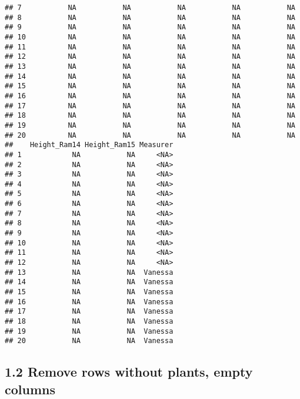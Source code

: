 \documentclass[]{article}
\newenvironment{Shaded}{\begin{snugshade}}{\end{snugshade}}
\newcommand{\KeywordTok}[1]{\textcolor[rgb]{0.13,0.29,0.53}{\textbf{#1}}}
\newcommand{\DecValTok}[1]{\textcolor[rgb]{0.00,0.00,0.81}{#1}}
\newcommand{\StringTok}[1]{\textcolor[rgb]{0.31,0.60,0.02}{#1}}
\newcommand{\OtherTok}[1]{\textcolor[rgb]{0.56,0.35,0.01}{#1}}
\newcommand{\OperatorTok}[1]{\textcolor[rgb]{0.81,0.36,0.00}{\textbf{#1}}}
\newcommand{\NormalTok}[1]{#1}
\begin{document}
\begin{verbatim}
## 7           NA           NA           NA           NA           NA
## 8           NA           NA           NA           NA           NA
## 9           NA           NA           NA           NA           NA
## 10          NA           NA           NA           NA           NA
## 11          NA           NA           NA           NA           NA
## 12          NA           NA           NA           NA           NA
## 13          NA           NA           NA           NA           NA
## 14          NA           NA           NA           NA           NA
## 15          NA           NA           NA           NA           NA
## 16          NA           NA           NA           NA           NA
## 17          NA           NA           NA           NA           NA
## 18          NA           NA           NA           NA           NA
## 19          NA           NA           NA           NA           NA
## 20          NA           NA           NA           NA           NA
##    Height_Ram14 Height_Ram15 Measurer
## 1            NA           NA     <NA>
## 2            NA           NA     <NA>
## 3            NA           NA     <NA>
## 4            NA           NA     <NA>
## 5            NA           NA     <NA>
## 6            NA           NA     <NA>
## 7            NA           NA     <NA>
## 8            NA           NA     <NA>
## 9            NA           NA     <NA>
## 10           NA           NA     <NA>
## 11           NA           NA     <NA>
## 12           NA           NA     <NA>
## 13           NA           NA  Vanessa
## 14           NA           NA  Vanessa
## 15           NA           NA  Vanessa
## 16           NA           NA  Vanessa
## 17           NA           NA  Vanessa
## 18           NA           NA  Vanessa
## 19           NA           NA  Vanessa
## 20           NA           NA  Vanessa
\end{verbatim}

\subsection{1.2 Remove rows without plants, empty
columns}\label{remove-rows-without-plants-empty-columns}

\begin{Shaded}
\end{Shaded}
\end{document}
